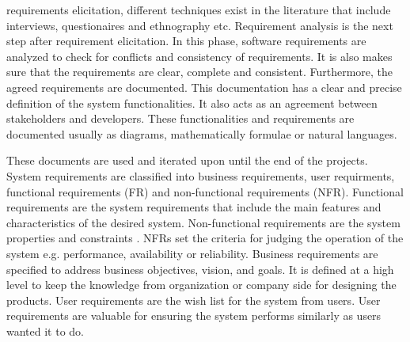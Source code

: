 requirements elicitation, different techniques exist in the literature that
include interviews, questionaires and ethnography etc.
Requirement analysis \cite{Nuseibeh:2000} is the next step
after requirement elicitation. In this phase, software requirements are analyzed
to check for conflicts and consistency of requirements. It is also makes sure
that the requirements are clear, complete and consistent.
Furthermore, the agreed requirements are documented. This documentation has a clear and precise
definition of the system functionalities. It also acts as an agreement between
stakeholders and developers. These functionalities and requirements are documented usually as diagrams, mathematically
formulae or natural languages.

These documents are used and iterated upon until the end of the projects.
System requirements are classified into business requirements, user requirments,
functional requirements (FR) and non-functional requirements (NFR). Functional
requirements are the system requirements that include the main features and
characteristics of the desired system. Non-functional requirements are the
system properties and constraints \cite{Davis:1993, Glinz}. NFRs set the
criteria for judging the operation of the system e.g.
performance, availability or reliability. Business requirements are specified to
address business objectives, vision, and goals. It is defined at a high level to
keep the knowledge from organization or company side for designing the products.
User requirements are the wish list for the system from users.
User requirements are valuable for ensuring the system performs similarly as users wanted it to do.
